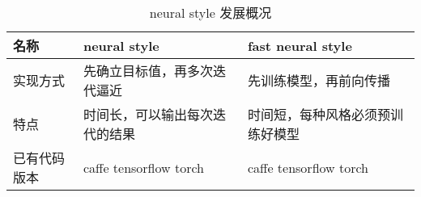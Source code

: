 \begin{table}[H]
\centering
\begin{tabular}{lll}
\toprule
  名称     & neural style\cite{neural-style}    & fast neural style\cite{fast-neural-style} \\
\midrule
实现方式   & 先确立目标值，再多次迭代逼近  & 先训练模型，再前向传播       \\
特点     & 时间长，可以输出每次迭代的结果 & 时间短，每种风格必须预训练好模型  \\
  已有代码版本 &caffe tensorflow torch & caffe tensorflow torch \\
\bottomrule
\end{tabular}
\caption{neural style 发展概况}
\label{tbl:compare-neural-style}
\end{table}
